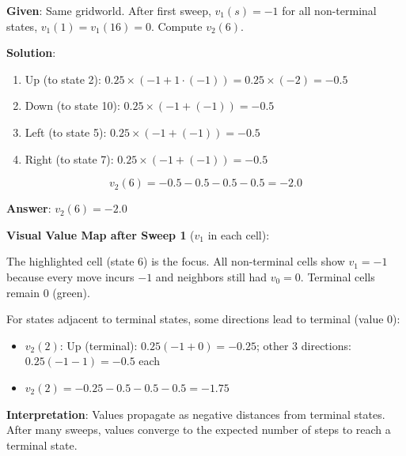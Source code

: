 \documentclass[11pt,a4paper]{article}
\begin{document}
\begin{tcolorbox}[colback=green!5!white,colframe=green!75!black,title=\textbf{Worked Example 26: Gridworld Second Sweep ($v_2$)}]
\textbf{Given}: Same gridworld. After first sweep, $v_1(s) = -1$ for all non-terminal states, $v_1(1) = v_1(16) = 0$. Compute $v_2(6)$.

\textbf{Solution}:
\begin{enumerate}
    \item Up (to state 2): $0.25 \times (-1 + 1 \cdot (-1)) = 0.25 \times (-2) = -0.5$
    \item Down (to state 10): $0.25 \times (-1 + (-1)) = -0.5$
    \item Left (to state 5): $0.25 \times (-1 + (-1)) = -0.5$
    \item Right (to state 7): $0.25 \times (-1 + (-1)) = -0.5$
\end{enumerate}

\[
v_2(6) = -0.5 - 0.5 - 0.5 - 0.5 = -2.0
\]

\textbf{Answer}: $v_2(6) = -2.0$

\textbf{Visual Value Map after Sweep 1} ($v_1$ in each cell):

\begin{center}
\end{center}

The highlighted cell (state 6) is the focus. All non-terminal cells show $v_1 = -1$ because every move incurs $-1$ and neighbors still had $v_0 = 0$. Terminal cells remain 0 (green).

For states adjacent to terminal states, some directions lead to terminal (value 0):
\begin{itemize}
    \item $v_2(2)$: Up (terminal): $0.25(-1+0) = -0.25$; other 3 directions: $0.25(-1-1) = -0.5$ each
    \item $v_2(2) = -0.25 - 0.5 - 0.5 - 0.5 = -1.75$
\end{itemize}

\textbf{Interpretation}: Values propagate as negative distances from terminal states. After many sweeps, values converge to the expected number of steps to reach a terminal state.
\end{tcolorbox}
\end{document}
